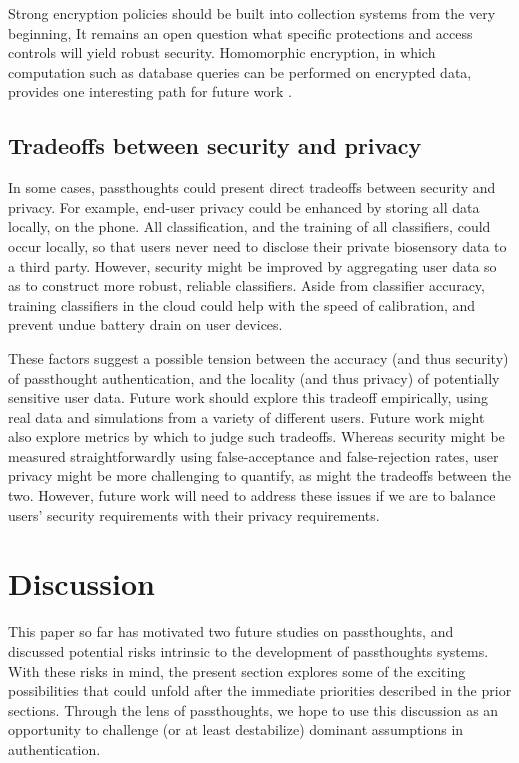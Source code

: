 \documentclass[sigconf]{acmart}
\begin{document}
Strong encryption policies should be built into collection systems from the very beginning, 
It remains an open question what specific protections and access controls will yield robust security.
Homomorphic encryption, in which computation such as database queries can be performed on encrypted data, provides one interesting path for future work \cite{Tu2013}.

\subsection{Tradeoffs between security and privacy}
\label{sec:org639a96b}

In some cases, passthoughts could present direct tradeoffs between security and privacy.
For example, end-user privacy could be enhanced by storing all data locally, on the phone. 
All classification, and the training of all classifiers, could occur locally, so that users never need to disclose their private biosensory data to a third party.
However, security might be improved by aggregating user data so as to construct more robust, reliable classifiers.
Aside from classifier accuracy, training classifiers in the cloud could help with the speed of calibration,
and prevent undue battery drain on user devices.

These factors suggest a possible tension between the accuracy (and thus security) of passthought authentication,
and the locality (and thus privacy) of potentially sensitive user data.
Future work should explore this tradeoff empirically, using real data and simulations from a variety of different users.
Future work might also explore metrics by which to judge such tradeoffs.
Whereas security might be measured straightforwardly using false-acceptance and false-rejection rates,
user privacy might be more challenging to quantify, as might the tradeoffs between the two.
However, future work will need to address these issues if we are to balance users' security requirements with their privacy requirements.

\section{Discussion}
\label{sec:orge41f8ae}

This paper so far has motivated two future studies on passthoughts, and
discussed potential risks intrinsic to the development of passthoughts systems.
With these risks in mind, the present section explores some of the exciting
possibilities that could unfold after the immediate priorities described in the
prior sections. Through the lens of passthoughts, we hope to use this discussion
as an opportunity to challenge (or at least destabilize) dominant assumptions in
authentication.
\end{document}
